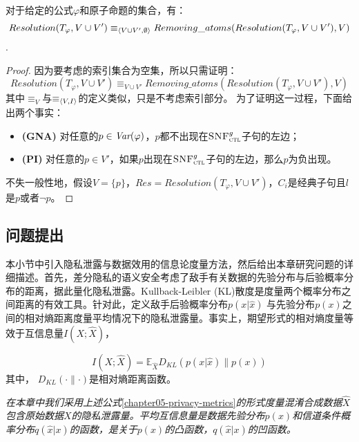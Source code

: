 \begin{proposition}\label{pro:remove}
	对于给定的公式$\varphi$和原子命题的集合，有：
	$$Resolution(T_{\varphi}, V \cup V') \equiv_{{\langle{V \cup V', \emptyset}\rangle}}   Removing\_atoms(Resolution(T_{\varphi}, V \cup V'), V)$$.
\end{proposition}
\begin{proof}
	因为要考虑的索引集合为空集，所以只需证明：
	$$Resolution(T_{\varphi}, V \cup V') \equiv_{V \cup V'}   Removing\_atoms(Resolution(T_{\varphi}, V \cup V'), V)$$
	其中$\equiv_V$与$\equiv_{{\langle{V,I}\rangle}}$的定义类似，只是不考虑索引部分。
	为了证明这一过程，下面给出两个事实：
	\begin{itemize}
		\item \textbf{(GNA)} 对任意的$p\in \textit{Var}(\varphi)$，$p$都不出现在${\textsc{SNF}_{\textsc{ctl}}^g}$子句的左边；
		\item \textbf{(PI)} 对任意的$p\in V'$，如果$p$出现在${\textsc{SNF}_{\textsc{ctl}}^g}$子句的左边，那么$p$为负出现。
	\end{itemize}

不失一般性地，假设$V=\{p\}$，$Res=Resolution(T_{\varphi}, V \cup V')$，$C_i$是经典子句且$l$是$p$或者$\neg p$。
\end{proof}

\subsection{问题提出}\label{chapter05-problem-statement}

本小节中引入隐私泄露与数据效用的信息论度量方法，然后给出本章研究问题的详细描述。首先，差分隐私的语义安全考虑了敌手有关数据的先验分布与后验概率分布的距离，据此量化隐私泄露。Kullback-Leibler (KL)散度是度量两个概率分布之间距离的有效工具\cite{cover2006elements}。针对此，定义敌手后验概率分布$p(x|\hat{x})$ 与先验分布$p(x)$之间的相对熵距离度量平均情况下的隐私泄露量。事实上，期望形式的相对熵度量等效于互信息量$I(X;\hat{X})$\cite{calmon2012privacy}，

\begin{equation}\label{chapter05-privacy-metrics}
	I(X;\hat{X})=\mathbb{E}_{\hat{X}}D_{KL}\left(p(x|\hat{x})\parallel p(x)\right)
\end{equation}
其中， $D_{KL}(\cdot \parallel \cdot)$是相对熵距离函数。

\begin{remark}{\em
在本章中我们采用上述公式}\ref{chapter05-privacy-metrics}{\em 的形式度量混淆合成数据$\hat{X}$包含原始数据$X$的隐私泄露量。平均互信息量是数据先验分布$p(x)$和信道条件概率分布$q(\hat{x}|x)$的函数，是关于$p(x)$的凸函数，$q(\hat{x}|x)$的凹函数。}
\end{remark}

